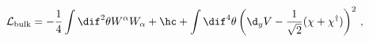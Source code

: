 \begin{equation}
\mathcal{L}_{\mathrm{bulk}} = -\frac{1}{4} \int \dif^2 \theta W^\alpha
W_\alpha + \hc + \int \dif^4 \theta \left(\d_y V -
\frac{1}{\sqrt{2}} (\chi+\chi^\dagger) \right)^2 \, ,
\end{equation}

